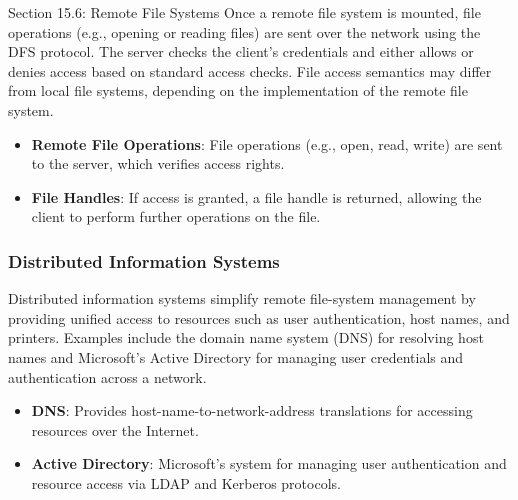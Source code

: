 \begin{notes}{Section 15.6: Remote File Systems}
    Once a remote file system is mounted, file operations (e.g., opening or reading files) are sent over the network using the DFS protocol. The server checks the client's credentials and either allows 
    or denies access based on standard access checks. File access semantics may differ from local file systems, depending on the implementation of the remote file system.
    
    \begin{highlight}
    
        \begin{itemize}
            \item \textbf{Remote File Operations}: File operations (e.g., open, read, write) are sent to the server, which verifies access rights.
            \item \textbf{File Handles}: If access is granted, a file handle is returned, allowing the client to perform further operations on the file.
        \end{itemize}
    
    \end{highlight}
    
    \subsubsection*{Distributed Information Systems}
    
    Distributed information systems simplify remote file-system management by providing unified access to resources such as user authentication, host names, and printers. Examples include the domain 
    name system (DNS) for resolving host names and Microsoft's Active Directory for managing user credentials and authentication across a network.
    
    \begin{highlight}
    
        \begin{itemize}
            \item \textbf{DNS}: Provides host-name-to-network-address translations for accessing resources over the Internet.
            \item \textbf{Active Directory}: Microsoft's system for managing user authentication and resource access via LDAP and Kerberos protocols.
        \end{itemize}
    
    \end{highlight}
    

\end{notes}
